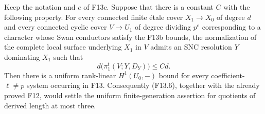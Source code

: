\begin{proposition}
Keep the notation and $e$ of F13c. Suppose that there is a constant
$C$ with the following property. For every connected finite \'etale
cover $X_1\to X_0$ of degree $d$ and every connected cyclic cover
$V\to U_1$ of degree dividing $p^e$ corresponding to a character
whose Swan conductors satisfy the F13b bounds, the normalization
of the complete local surface underlying $X_1$ in $V$ admits an
SNC resolution $Y$ dominating $X_1$ such that
\[
 d\bigl(\pi_1^t(V;Y,D_Y)\bigr)\leq Cd.
 \tag{F13.6}
\]
Then there is a uniform rank-linear $H^1(U_0,-)$ bound for every
coefficient-$\ell\ne p$ system occurring in F13. Consequently
(F13.6), together with the already proved F12, would settle the
uniform finite-generation assertion for quotients of derived
length at most three.
\end{proposition}
